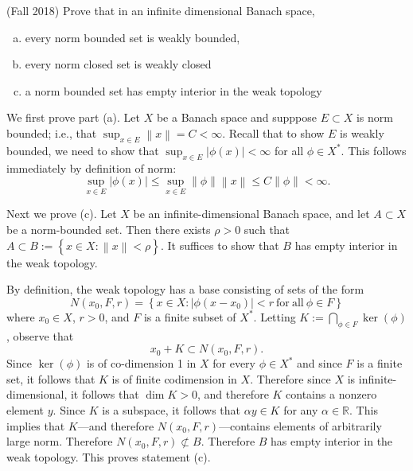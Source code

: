 \documentclass[answers]{exam}
\theoremstyle{problemstyle}
\newcommand{\norm}[1]{\left\lVert#1\right\rVert} %
\newcommand{\1}[1]{\textbf{1}_{\left[#1\right]}} %
\def\R{\mathbb{R}} %
\begin{document}
\begin{questions}
\question (Fall 2018)
  Prove that in an infinite dimensional Banach space,
  \begin{enumerate}[(a)]
  \item every norm bounded set is weakly bounded,
  \item every norm closed set is weakly closed
  \item a norm bounded set has empty interior in the weak topology
  \end{enumerate}
  
\begin{solution}
    We first prove part (a). Let $X$ be a Banach space and supppose $E\subset X$ is norm bounded; i.e., that $\sup_{x\in E}\norm{x}=C<\infty$. Recall that to show $E$ is weakly bounded, we need to show that $\sup_{x\in E}|\phi(x)|<\infty$ for all $\phi\in X^{*}$. This follows immediately by definition of norm:
    \begin{equation*}
      \sup_{x\in E}|\phi(x)| \leq\sup_{x\in E} \norm{\phi}\norm{x} \leq C \norm{\phi}<\infty.
    \end{equation*}

    Next we prove (c). Let $X$ be an infinite-dimensional Banach space, and let $A\subset X$ be a norm-bounded set. Then there exists $\rho>0$ such that $A\subset B:=\left\{ x\in X: \norm{x}<\rho \right\}$. It suffices to show that $B$ has empty interior in the weak topology.
    
      By definition, the weak topology has a base consisting of sets of the form
    \begin{equation}\label{eq:1}
      N(x_{0},F,r)=\left\{ x\in X : |\phi(x-x_{0})|<r \mathrm{\ for\ all\ }\phi\in F\right\}
    \end{equation}
    where $x_{0}\in X$, $r>0$, and $F$ is a finite subset of $X^{*}$. Letting $K:= \bigcap_{\phi \in F} \ker(\phi)$, observe that
    \begin{equation*}
      x_{0}+ K \subset N(x_{0},F,r).
    \end{equation*}
    Since $\ker(\phi)$ is of co-dimension 1 in $X$ for every $\phi\in X^{*}$ and since $F$ is a finite set, it follows that $K$ is of finite codimension in $X$. Therefore since $X$ is infinite-dimensional, it follows that $\dim K >0$, and therefore $K$ contains a nonzero element $y$. Since $K$ is a subspace, it follows that $\alpha y\in K$ for any $\alpha\in \R$. This implies that $K$---and therefore $N(x_{0},F,r)$---contains elements of arbitrarily large norm. Therefore $N(x_{0},F,r)\not\subset B$. Therefore $B$ has empty interior in the weak topology. This proves statement (c).


\end{solution}
\end{questions}
\end{document}
